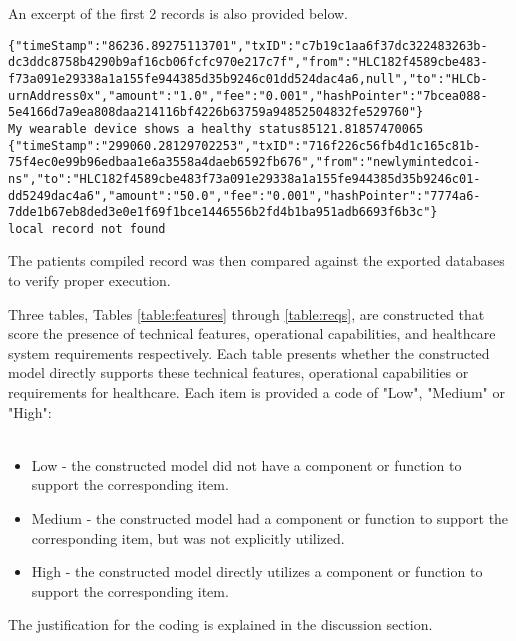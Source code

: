 \documentclass[12pt]{report}
\begin{document}
An excerpt of the first 2 records is also provided below. 

\begin{Verbatim}[fontsize=\small]
{"timeStamp":"86236.89275113701","txID":"c7b19c1aa6f37dc322483263b-
dc3ddc8758b4290b9af16cb06fcfc970e217c7f","from":"HLC182f4589cbe483-
f73a091e29338a1a155fe944385d35b9246c01dd524dac4a6,null","to":"HLCb-
urnAddress0x","amount":"1.0","fee":"0.001","hashPointer":"7bcea088-
5e4166d7a9ea808daa214116bf4226b63759a94852504832fe529760"}
My wearable device shows a healthy status85121.81857470065
{"timeStamp":"299060.28129702253","txID":"716f226c56fb4d1c165c81b-
75f4ec0e99b96edbaa1e6a3558a4daeb6592fb676","from":"newlymintedcoi-
ns","to":"HLC182f4589cbe483f73a091e29338a1a155fe944385d35b9246c01-
dd5249dac4a6","amount":"50.0","fee":"0.001","hashPointer":"7774a6-
7dde1b67eb8ded3e0e1f69f1bce1446556b2fd4b1ba951adb6693f6b3c"}
local record not found
\end{Verbatim}

The patients compiled record was then compared against the exported databases to verify proper execution. %


Three tables, Tables \ref{table:features} through \ref{table:reqs}, are constructed that score the presence of technical features, operational capabilities, and healthcare system requirements respectively. Each table presents whether the constructed model directly supports these technical features, operational capabilities or requirements for healthcare. Each item is provided a code of "Low", "Medium" or "High":\\~\\

\begin{itemize}
 \item Low - the constructed model did not have a component or function to support the corresponding item.
 \item Medium - the constructed model had a component or function to support the corresponding item, but was not explicitly utilized.
 \item High - the constructed model directly utilizes a component or function to support the corresponding item. 
\end{itemize}
 
The justification for the coding is explained in the discussion section.
\end{document}

